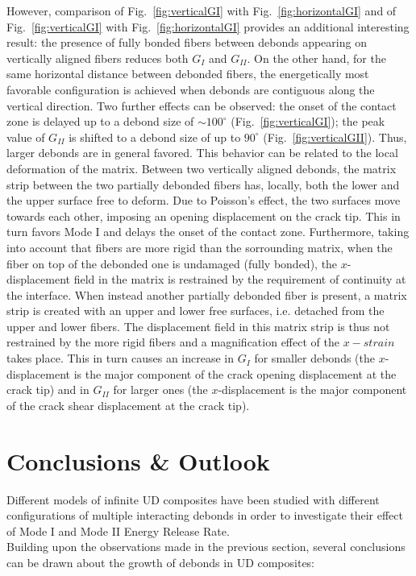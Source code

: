 \documentclass[review]{elsarticle}
\begin{document}
However, comparison of Fig.~\ref{fig:verticalGI} with Fig.~\ref{fig:horizontalGI} and of Fig.~\ref{fig:verticalGI} with Fig.~\ref{fig:horizontalGI} provides an additional interesting result: the presence of fully bonded fibers between debonds appearing on vertically aligned fibers reduces both $G_{I}$ and $G_{II}$. On the other hand, for the same horizontal distance between debonded fibers, the energetically most favorable configuration is achieved when debonds are contiguous along the vertical direction. Two further effects can be observed: the onset of the contact zone is delayed up to a debond size of $\sim100^{\circ}$ (Fig.~\ref{fig:verticalGI}); the peak value of $G_{II}$ is shifted to a debond size of up to $90^{\circ}$ (Fig.~\ref{fig:verticalGII}). Thus, larger debonds are in general favored. This behavior can be related to the local deformation of the matrix. Between two vertically aligned debonds, the matrix strip between the two partially debonded fibers has, locally, both the lower and the upper surface free to deform. Due to Poisson's effect, the two surfaces move towards each other, imposing an opening displacement on the crack tip. This in turn favors Mode I and delays the onset of the contact zone. Furthermore, taking into account that fibers are more rigid than the sorrounding matrix, when the fiber on top of the debonded one is undamaged (fully bonded), the $x$-displacement field in the matrix is restrained by the requirement of continuity at the interface. When instead another partially debonded fiber is present, a matrix strip is created with an upper and lower free surfaces, i.e. detached from the upper and lower fibers. The displacement field in this matrix strip is thus not restrained by the more rigid fibers and a magnification effect of the $x-strain$ takes place. This in turn causes an increase in $G_{I}$ for smaller debonds (the $x$-displacement is the major component of the crack opening displacement at the crack tip) and  in $G_{II}$ for larger ones (the $x$-displacement is the major component of the crack shear displacement at the crack tip).

\section{Conclusions \& Outlook}

Different models of infinite UD composites have been studied with different configurations of multiple interacting debonds in order to investigate their effect of Mode I and Mode II Energy Release Rate.\\
Building upon the observations made in the previous section, several conclusions can be drawn about the growth of debonds in UD composites:
\end{document}
